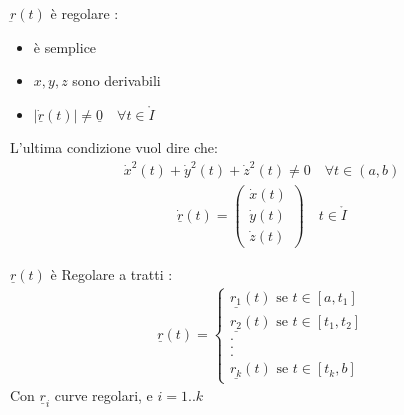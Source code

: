 \documentclass[a4paper, oneside]{article}
\begin{document}
\begin{definition}
    $\underbar{r}(t)$ è regolare :
    \begin{itemize}
        \item è semplice
        \item $x,y,z$ sono derivabili
        \item $\left\lvert \underline{\dot{r}}(t) \right\rvert \neq \underline{0} \quad \forall t \in \mathring{I}$
    \end{itemize}
    L'ultima condizione vuol dire che:
    \begin{gather*}
        \dot{x}^2(t) + \dot{y}^2(t) + \dot{z}^2(t) \neq 0 \quad \forall t \in (a,b)
    \end{gather*}
    \begin{gather*}
        \underline{\dot{r}}(t) = \begin{pmatrix}
            \dot{x}(t)\\
            \dot{y}(t)\\
            \dot{z}(t)
        \end{pmatrix}\quad t \in \mathring{I}
    \end{gather*}
\end{definition}
\begin{definition}
    $\underline{r}(t)$ è Regolare  a tratti :
    \begin{gather*}
        \underline{r}(t) = \begin{cases}
            \underline{r_1}(t) \text{ se } t \in [a,t_1]\\
            \underline{r_2}(t) \text{ se } t \in [t_1,t_2]\\
            .\\
            .\\
            .\\
            \underline{r_k}(t) \text{ se } t \in [t_k,b]
        \end{cases}
    \end{gather*} 
    Con $\underline{r}_i$ curve regolari, e $i = 1..k$
\end{definition}
\end{document}
